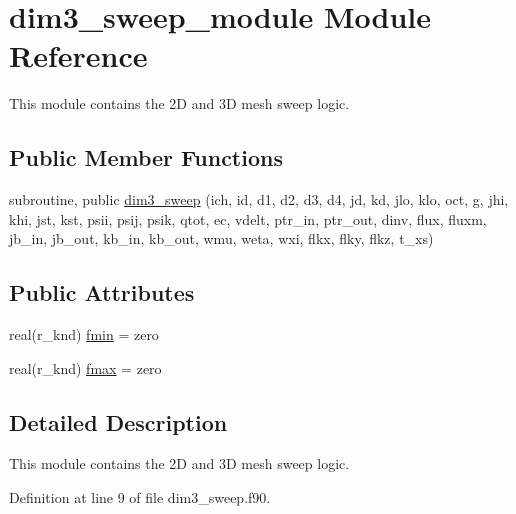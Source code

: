 \hypertarget{classdim3__sweep__module}{\section{dim3\-\_\-sweep\-\_\-module Module Reference}
\label{classdim3__sweep__module}
}


This module contains the 2\-D and 3\-D mesh sweep logic.  


\subsection*{Public Member Functions}
\begin{DoxyCompactItemize}
\item 
subroutine, public \hyperlink{classdim3__sweep__module_a201ea00518f54fac4152d4ce277de50d}{dim3\-\_\-sweep} (ich, id, d1, d2, d3, d4, jd, kd, jlo, klo, oct, g, jhi, khi, jst, kst, psii, psij, psik, qtot, ec, vdelt, ptr\-\_\-in, ptr\-\_\-out, dinv, flux, fluxm, jb\-\_\-in, jb\-\_\-out, kb\-\_\-in, kb\-\_\-out, wmu, weta, wxi, flkx, flky, flkz, t\-\_\-xs)
\end{DoxyCompactItemize}
\subsection*{Public Attributes}
\begin{DoxyCompactItemize}
\item 
real(r\-\_\-knd) \hyperlink{classdim3__sweep__module_a5ec448e8a99070a51d62e75a430a9c60}{fmin} = zero
\item 
real(r\-\_\-knd) \hyperlink{classdim3__sweep__module_aac295110595a9c85602d58906d51cd46}{fmax} = zero
\end{DoxyCompactItemize}


\subsection{Detailed Description}
This module contains the 2\-D and 3\-D mesh sweep logic. 

Definition at line 9 of file dim3\-\_\-sweep.\-f90.



